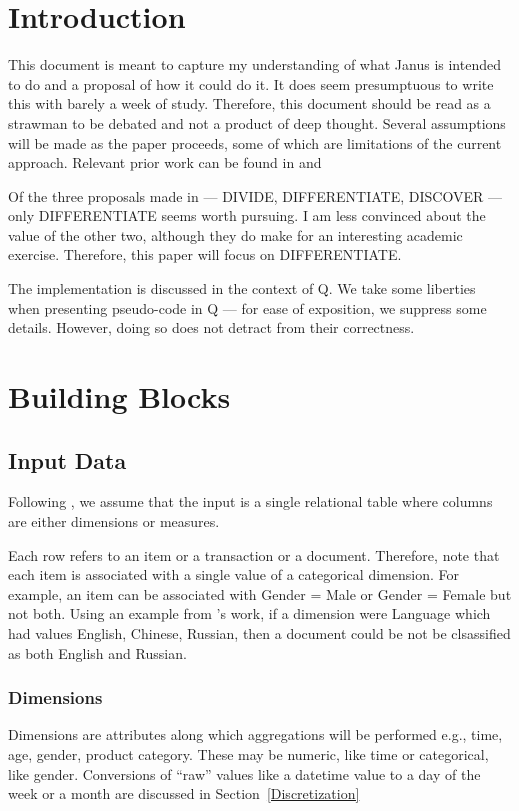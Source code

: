 
\section{Introduction}

This document is meant to capture my understanding of what Janus is
intended to do and a proposal of how it could do it. It does seem
presumptuous to write this with barely a week of study. Therefore,
this document should be read as a strawman to be debated and not a
product of deep thought. Several assumptions will be made as the paper proceeds,
some of which are limitations of the current approach.
Relevant prior work can be found in \cite{sarawagi99}
and \cite{Fagin05}

Of the three proposals made in \cite{Fagin05} --- DIVIDE,
DIFFERENTIATE, DISCOVER --- only DIFFERENTIATE seems worth pursuing. 
I am less convinced about the value of the other two, although they do 
make for an interesting academic exercise. 
Therefore, this paper will focus on DIFFERENTIATE.

The implementation is discussed in the context of Q. We take some liberties when
presenting pseudo-code in Q --- for ease of exposition, we suppress some
details. However, doing so does not detract from their correctness.

\section{Building Blocks}

\subsection{Input Data}
Following \cite{Fagin05}, we assume that the input is a 
single relational
table where columns are either dimensions or measures. 

Each row refers to an item or a transaction or a document. 
Therefore, note that each item is associated with a single value of a
categorical dimension. For example, an item can be associated with Gender = Male
or Gender = Female but not both.
Using an example from \cite{Fagin0}'s work, if a dimension were Language which had 
values English, Chinese, Russian, then a document could be not be clsassified as
both English and Russian.


\subsubsection{Dimensions}
Dimensions are
attributes along which aggregations will be performed e.g., time, age,
gender, product category. These may be numeric, like time or
categorical, like gender.
Conversions of ``raw'' values like a datetime value to a day of the week or a
month are discussed in Section~\ref{Discretization}


